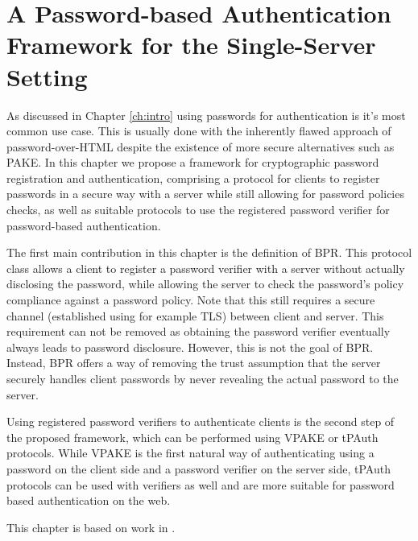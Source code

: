 \chapter[A Password Authentication Framework for the Single-Server Setting]{A Password-based Authentication Framework for the Single-Server Setting} \label{ch:vpake}

As discussed in Chapter \ref{ch:intro} using passwords for authentication is it's most common use case. 
This is usually done with the inherently flawed approach of password-over-\ac{HTML} despite the existence of more secure alternatives such as \ac{PAKE}.
In this chapter we propose a framework for cryptographic password registration and authentication, comprising a protocol for clients to register passwords in a secure way with a server while still allowing for password policies checks, as well as suitable protocols to use the registered password verifier for password-based authentication.

The first main contribution in this chapter is the definition of \acl{BPR}.
This protocol class allows a client to register a password verifier with a server without actually disclosing the password, while allowing the server to check the password's policy compliance against a password policy.
Note that this still requires a secure channel (established using for example \ac{TLS}) between client and server.
This requirement can not be removed as obtaining the password verifier eventually always leads to password disclosure.
However, this is not the goal of \ac{BPR}.
Instead, \ac{BPR} offers a way of removing the trust assumption that the server securely handles client passwords by never revealing the actual password to the server.

Using registered password verifiers to authenticate clients is the second step of the proposed framework, which can be performed using \ac{VPAKE} or \ac{tPAuth} protocols.
While \ac{VPAKE} is the first natural way of authenticating using a password on the client side and a password verifier on the server side, \ac{tPAuth} protocols can be used with verifiers as well and are more suitable for password based authentication on the web.
 
\smallskip
\noindent
This chapter is based on work in \cite{Kiefer13a,KieferM15a,DongK15a}.
 
